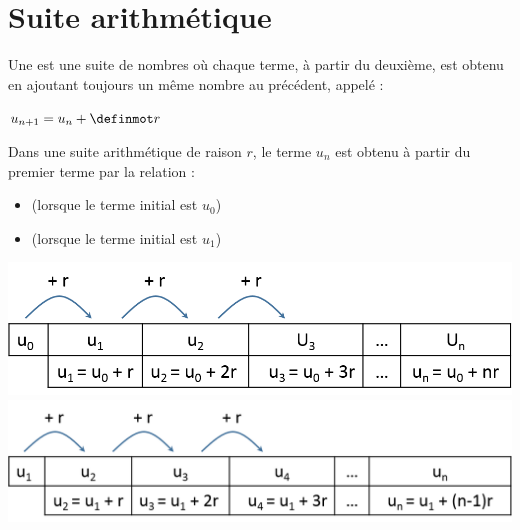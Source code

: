 \documentclass[12pt,a4paper]{article}
\date{}
\title{}
\begin{document}
{}

\section{Suite arithmétique}

\begin{mydef}
	Une  est une suite de nombres où chaque terme, à partir du deuxième, est obtenu en ajoutant toujours un même nombre au précédent, appelé  :
	
	\begin{center}
		$u_{n+1}=u_n + \kw{r}$
	\end{center} 
\end{mydef}

\begin{myprop}
	Dans une suite arithmétique de raison $r$, le terme $u_n$ est obtenu à partir du premier terme par la relation :
	\begin{itemize}
		\item {} (lorsque le terme initial est $u_0$) 
		\item {} (lorsque le terme initial est $u_1$)
	\end{itemize}
	
	\begin{multicols}{2}
		\includegraphics[scale=0.45]{./img/arith1}
		\includegraphics[scale=0.45]{./img/arith2}
	\end{multicols}
\end{myprop}


%
\end{document}
